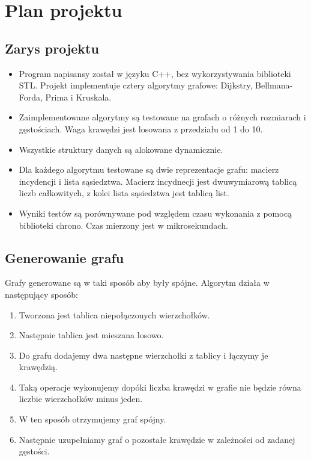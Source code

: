 \documentclass[11pt]{article}
\begin{document}
\section{Plan projektu}
\subsection{Zarys projektu}
\begin{itemize}

    \item Program napisansy został w języku C++, bez wykorzystywania biblioteki STL.
          Projekt implementuje cztery algorytmy grafowe: Dijkstry, Bellmana-Forda, Prima i Kruskala.

    \item Zaimplementowane algorytmy są testowane na grafach o różnych rozmiarach i gęstościach. Waga krawędzi jest losowana z przedziału od 1 do 10.

    \item Wszystkie struktury danych są alokowane dynamicznie.

    \item Dla każdego algorytmu testowane są dwie reprezentacje grafu: macierz incydencji i lista sąsiedztwa.
          Macierz incydnecji jest dwuwymiarową tablicą liczb całkowitych, z kolei lista sąsiedztwa jest tablicą list.

    \item Wyniki testów są porównywane pod względem czasu wykonania z pomocą biblioteki chrono.
          Czas mierzony jest w mikrosekundach.

\end{itemize}
\subsection{Generowanie grafu}
Grafy generowane są w taki sposób aby były spójne. Algorytm działa w następujący sposób:
\begin{enumerate}
    \item Tworzona jest tablica niepołączonych wierzchołków.
    \item Następnie tablica jest mieszana losowo.
    \item Do grafu dodajemy dwa następne wierzchołki z tablicy i łączymy je krawędzią.
    \item Taką operacje wykonujemy dopóki liczba krawędzi w grafie nie będzie równa liczbie wierzchołków minus jeden.
    \item W ten sposób otrzymujemy graf spójny.
    \item Następnie uzupełniamy graf o pozostałe krawędzie w zależności od zadanej gęstości.
\end{enumerate}
\end{document}
